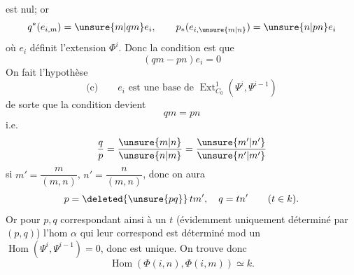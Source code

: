est nul; or
\[
q^*(e_{i,m})=\unsure{m|qm}e_i,\qquad
p_*(e_{i,\unsure{m|n}})=\unsure{n|pn}e_i
\]
où $e_i$ définit l'extension $\Phi^i$.
Donc la condition est que
\[
(qm-pn)e_i=0
\]
On fait l'hypothèse
\[
\text{(c)}\qquad
\boxed{e_i\text{ est une base de }\operatorname{Ext}^1_{C_0}(\Psi^i,\Psi^{i-1})}
\]
de sorte que la condition devient
\[
qm=pn
\]
i.e.\quad
\[
\frac q p=\frac{\unsure{m|n}}{\unsure{n|m}}
=\frac{\unsure{m'|n'}}{\unsure{n'|m'}}
\]
si $m'=\dfrac{m}{(m,n)}$, $n'=\dfrac{n}{(m,n)}$, donc
on aura
\[
p=\deleted{\unsure{pq}}\,t m',\quad q=t n'\qquad(t\in k).
\]
Or pour $p,q$ correspondant ainsi
à un $t$ (évidemment uniquement
déterminé par $(p,q)$) l'hom
$\alpha$ qui leur correspond est déterminé
mod un $\operatorname{Hom}(\Psi^i,\Psi^{i-1})=0$,
donc est unique. On trouve donc
\[
\operatorname{Hom}(\Phi(i,n),\Phi(i,m))\simeq k.
\]
